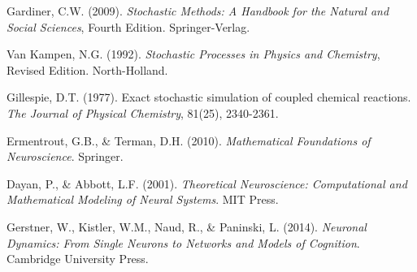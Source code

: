 \documentclass[12pt,a4paper]{article}
\begin{document}
\begin{thebibliography}{99}
Gardiner, C.W. (2009). \textit{Stochastic Methods: A Handbook for the Natural and Social Sciences}, Fourth Edition. Springer-Verlag.

Van Kampen, N.G. (1992). \textit{Stochastic Processes in Physics and Chemistry}, Revised Edition. North-Holland.

Gillespie, D.T. (1977). Exact stochastic simulation of coupled chemical reactions. \textit{The Journal of Physical Chemistry}, 81(25), 2340-2361.

Ermentrout, G.B., \& Terman, D.H. (2010). \textit{Mathematical Foundations of Neuroscience}. Springer.

Dayan, P., \& Abbott, L.F. (2001). \textit{Theoretical Neuroscience: Computational and Mathematical Modeling of Neural Systems}. MIT Press.

Gerstner, W., Kistler, W.M., Naud, R., \& Paninski, L. (2014). \textit{Neuronal Dynamics: From Single Neurons to Networks and Models of Cognition}. Cambridge University Press.

\end{thebibliography}
\end{document}
